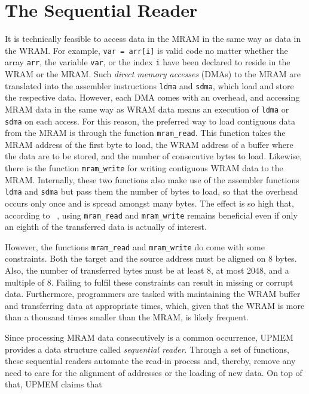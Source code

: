 \section{The Sequential Reader}
\label{sec:mram:seq_reader}

It is technically feasible to access data in the MRAM in the same way as data in the WRAM.
For example, \lstinline|var = arr[i]| is valid code no matter whether the array \lstinline|arr|, the variable \lstinline|var|, or the index \lstinline|i| have been declared to reside in the WRAM or the MRAM.
Such \emph{direct memory accesses} (DMAs) to the MRAM are translated into the assembler instructions \lstinline|ldma| and \lstinline|sdma|, which load and store the respective data.
However, each DMA comes with an overhead, and accessing MRAM data in the same way as WRAM data means an execution of \lstinline|ldma| or \lstinline|sdma| on each access.
For this reason, the preferred way to load contiguous data from the MRAM is through the function \lstinline|mram_read|.
This function takes the MRAM address of the first byte to load, the WRAM address of a buffer where the data are to be stored, and the number of consecutive bytes to load.
Likewise, there is the function \lstinline|mram_write| for writing contiguous WRAM data to the MRAM.
Internally, these two \langC{} functions also make use of the assembler functions \lstinline|ldma| and \lstinline|sdma| but pass them the number of bytes to load, so that the overhead occurs only once and is spread amongst many bytes.
The effect is so high that, according to \citeauthor{mutlu2022Benchmarking}~\cite[11]{mutlu2022Benchmarking}, using \lstinline|mram_read| and \lstinline|mram_write| remains beneficial even if only an eighth of the transferred data is actually of interest.

However, the functions \lstinline|mram_read| and \lstinline|mram_write| do come with some constraints.
Both the target and the source address must be aligned on 8 bytes.
Also, the number of transferred bytes must be at least 8, at most 2048, and a multiple of 8.
Failing to fulfil these constraints can result in missing or corrupt data.
Furthermore, programmers are tasked with maintaining the WRAM buffer and transferring data at appropriate times, which, given that the WRAM is more than a thousand times smaller than the MRAM, is likely frequent.

Since processing MRAM data consecutively is a common occurrence, UPMEM provides a data structure called \emph{sequential reader}.
Through a set of \langC{} functions, these sequential readers automate the read-in process and, thereby, remove any need to care for the alignment of addresses or the loading of new data.
On top of that, UPMEM claims that ~\cite[Memory management -- Sequential readers]{upmemSDK}

